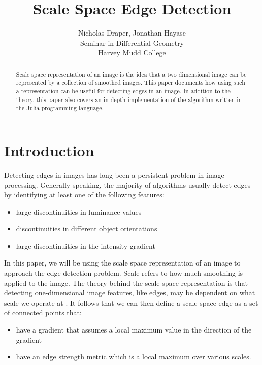 \documentclass{article}
\title{Scale Space Edge Detection}
\author{
  Nicholas Draper, Jonathan Hayase\\
  Seminar in Differential Geometry\\
  Harvey Mudd College
}
\begin{document}
\maketitle

\begin{abstract}
  Scale space representation of an image is the idea that a two dimensional image can be represented by a collection of smoothed images.
  This paper documents how using such a representation can be useful for detecting edges in an image.
  In addition to the theory, this paper also covers an in depth implementation of the algorithm written in the Julia programming language.
\end{abstract}

\section{Introduction}
Detecting edges in images has long been a persistent problem in image processing.  
Generally speaking, the majority of algorithms usually detect edges by identifying at least one of the following features:
\begin{itemize}
\item large discontinuities in luminance values
\item discontinuities in different object orientations
\item large discontinuities in the intensity gradient
\end{itemize}
In this paper, we will be using the scale space representation of an image to approach the edge detection problem.
Scale refers to how much smoothing is applied to the image. 
The theory behind the scale space representation is that detecting one-dimensional image features, like edges, may be dependent on what scale we operate at \cite{Lindeberg1998}. 
It follows that we can then define a scale space edge as a set of connected points that:
\begin{itemize}
\item have a gradient that assumes a local maximum value in the direction of the gradient\cite{Lindeberg1998}
\item have an edge strength metric which is a local maximum over various scales\cite{Lindeberg1998}.
\end{itemize}
\end{document}
